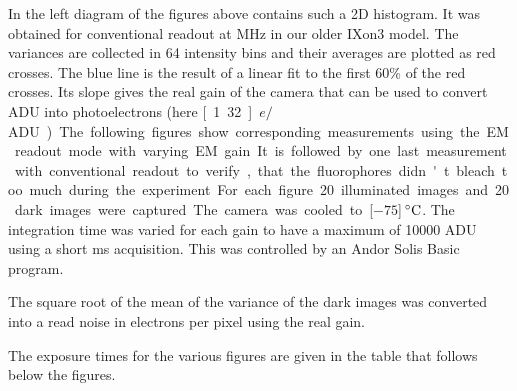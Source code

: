 
In the left diagram of the figures above contains such a 2D
histogram. It was obtained for conventional readout at \unit[3]{MHz}
in our older IXon3 model. The variances are collected in 64 intensity
bins and their averages are plotted as red crosses. The blue line is
the result of a linear fit to the first $60\%$ of the red crosses. Its
slope gives the real gain of the camera that can be used to convert
ADU into photoelectrons (here \unit[1.32]{$e/$ADU}).

The following figures show corresponding measurements using the EM
readout mode with varying EM gain. It is followed by one last
measurement with conventional readout to verify, that the fluorophores
didn't bleach too much during the experiment.

For each figure 20 illuminated images and 20 dark images were
captured. The camera was cooled to \unit[$-75$]{$\,^{\circ}{\rm
    C}$}. The integration time was varied for each gain to have a
maximum of 10000 ADU using a short \unit[10]{ms} acquisition. This was
controlled by an Andor Solis Basic program.

The square root of the mean of the variance of the dark images was
converted into a read noise in electrons per pixel using the real
gain.

The exposure times for the various figures are given in the table that
follows below the figures.


